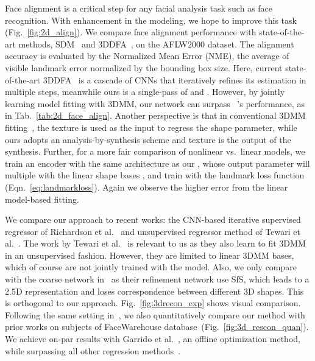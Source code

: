 Face alignment is a critical step for any facial analysis task such as face recognition. 
With enhancement in the modeling, we hope to improve this task (Fig.~\ref{fig:2d_align}). 
We compare face alignment performance with state-of-the-art methods, SDM~\cite{yan2013learn} and 3DDFA~\cite{zhu2016face}, on the AFLW2000 dataset. 
The alignment accuracy is evaluated by the Normalized Mean Error (NME), the average of visible landmark error normalized by the bounding box size.
Here, current state-of-the-art 3DDFA~\cite{zhu2016face} is a cascade of CNNs that iteratively refines its estimation in multiple steps, meanwhile ours is a single-pass of  and . 
However, by jointly learning model fitting with 3DMM, our network can surpass ~\cite{zhu2016face}'s performance, as in Tab.~\ref{tab:2d_face_align}.
Another perspective is that in conventional 3DMM fitting~\cite{zhu2016face}, the texture is used as the input to regress the shape parameter, while ours adopts an analysis-by-synthesis scheme and texture is the output of the synthesis.
Further, for a more fair comparison of nonlinear vs.~linear models, we train an encoder with the same architecture as our , whose output parameter will multiple with the linear shape bases , and train with the landmark loss function (Eqn.~\ref{eq:landmarkloss}). 
Again we observe the higher error from the linear model-based fitting.

We compare our approach to recent works: the CNN-based iterative supervised regressor of Richardson et al.~\cite{richardson20163d, richardson2017learning} and unsupervised regressor method of Tewari et al.~\cite{tewari2017mofa}.
The work by Tewari et al.~\cite{tewari2017mofa} is relevant to us as they also learn to fit 3DMM in an unsupervised fashion. 
However, they are limited to linear 3DMM bases, which of course are not jointly trained with the model. 
Also, we only compare with the coarse network in~\cite{richardson2017learning} as their refinement network use SfS, which leads to a 2.5D representation and loses correspondence between different 3D shapes. 
This is orthogonal to our approach.
Fig.~\ref{fig:3drecon_exp} shows visual comparison. 
Following the same setting in~\cite{tewari2017mofa}, we also quantitatively compare our method with prior works on  subjects of FaceWarehouse database~(Fig.~\ref{fig:3d_rescon_quan}). 
We achieve on-par results with Garrido et al.~\cite{garrido2016reconstruction}, an offline optimization method, while surpassing all other regression methods~\cite{tran2017regressing, richardson2017learning, tewari2017mofa}.


